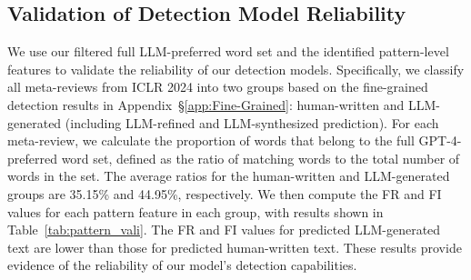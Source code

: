 





\subsection{Validation of Detection Model Reliability}
We use our filtered full LLM-preferred word set and the identified pattern-level features to validate the reliability of our detection models.
Specifically, we classify all meta-reviews from ICLR 2024 into two groups based on the fine-grained detection results in Appendix~\S\ref{app:Fine-Grained}: human-written and LLM-generated (including LLM-refined and LLM-synthesized prediction). For each meta-review, we calculate the proportion of words that belong to the full GPT-4-preferred word set, defined as the ratio of matching words to the total number of words in the set. The average ratios for the human-written and LLM-generated groups are 35.15\% and 44.95\%, respectively. 
We then compute the FR and FI values for each pattern feature in each group, with results shown in Table~\ref{tab:pattern_vali}. The FR and FI values for predicted LLM-generated text are lower than those for predicted human-written text.
These results provide evidence of the reliability of our model's detection capabilities.


